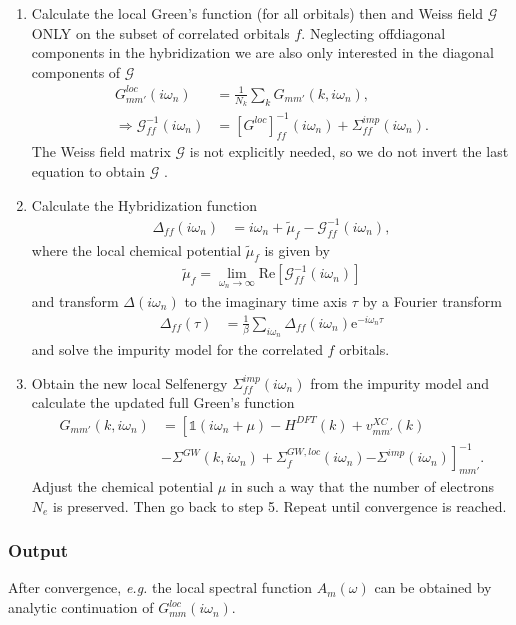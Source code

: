 \documentclass[12pt,a4paper]{scrartcl}
\numberwithin{equation}{subsection}
\newcommand{\GF}{Green's function}
\newcommand{\unity}{\mathds{1}}
\begin{document}
\begin{enumerate}
\item Calculate the local {\GF} (for all orbitals) then and Weiss field $\mathscr{G}$ ONLY
on the subset of correlated orbitals $f$. Neglecting
offdiagonal components in the hybridization we are also only interested 
in the diagonal components of $\mathscr{G}$
\begin{align}
 G^{loc}_{mm'}(i\omega_n) 
 &= \frac{1}{N_k}\sum_k  G_{mm'}(k,i\omega_n) ,\\
%
\Rightarrow \mathscr{G}^{-1}_{ff}(i\omega_n) &= [G^{loc} ]^{-1}_{ff} (i\omega_n)
                + \Sigma^{imp}_{ff}(i\omega_n) .
\end{align}
The Weiss field matrix $\mathscr{G}$ is not explicitly needed, so
we do not invert the last equation to obtain $\mathscr{G}$ .

\item Calculate the Hybridization function
\begin{align}
 \Delta_{ff}(i\omega_n)
 &= i\omega_n + \tilde{\mu}_f -  \mathscr{G}^{-1}_{ff}(i\omega_n),
\end{align}
where the local chemical potential $\tilde{\mu}_f$ is given by
\begin{align}
 \tilde{\mu}_f = \lim_{\omega_n\rightarrow \infty} \mathrm{Re}\left[ \mathscr{G}^{-1}_{ff}(i\omega_n) \right]
\end{align}
and transform $\Delta(i\omega_n)$ to the imaginary time axis $\tau$ by a Fourier transform
\begin{align}
 \Delta_{ff}(\tau) &= \frac{1}{\beta} \sum_{i\omega_n} \Delta_{ff}(i\omega_n) \mathrm{e}^{-i\omega_n\tau}
\end{align}
and solve the impurity model for the correlated $f$ orbitals.

\item Obtain the new local Selfenergy $\Sigma^{imp}_{ff}(i\omega_n)$ 
from the impurity model and calculate the updated full {\GF}
\begin{align}
 G_{mm'}(k,i\omega_n) 
 &= \left[ \unity(i\omega_n+\mu ) -H^{DFT}(k) + v^{XC}_{mm'}(k) \right.\\
          &- \Sigma^{GW}(k,i\omega_n) 
          + \Sigma^{GW,loc}_f(i\omega_n)
          \left. - \Sigma^{imp}(i\omega_n) \right]^{-1}_{mm'}.
\end{align}
Adjust the chemical potential $\mu$ in such a way that the number of electrons
$N_e$ is preserved.
Then go back to step 5. Repeat until convergence
is reached.

\end{enumerate}


\subsubsection{Output}
After convergence, {\it e.g.} the local spectral function $A_m(\omega)$
can be obtained by analytic continuation of $ G^{loc}_{mm}(i\omega_n) $.
\end{document}

